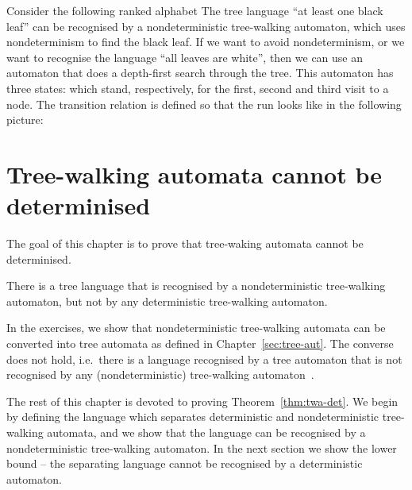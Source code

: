 \begin{example}\label{ex:dfs}
Consider the following ranked alphabet 
The tree language ``at least one black leaf'' can be recognised by a nondeterministic tree-walking automaton, which uses nondeterminism to find the black leaf. If we want to avoid nondeterminism, or we want to recognise the language ``all leaves are white'', then  we can use an automaton that does a depth-first search through the tree. This automaton has three states: 
which stand, respectively, for the first, second and third visit to a node. The   transition relation is defined so that the run looks like in the following picture:
\end{example}

\section{Tree-walking automata cannot be determinised}
The goal of this chapter is to prove that tree-waking automata cannot be determinised. 
\begin{theorem}\label{thm:twa-det}\cite[Theorem 5]{Bojanczyk:2006ff}
	There is a tree language that is recognised by a nondeterministic tree-walking automaton, but not by any deterministic tree-walking automaton.
\end{theorem}
In the exercises, we show that nondeterministic tree-walking automata can be converted into  tree automata as defined in Chapter~\ref{sec:tree-aut}. The converse does not hold, i.e.~there is a language recognised by a tree automaton that is not recognised by any (nondeterministic) tree-walking automaton~\cite[Theorem 2]{Bojanczyk:2008cx}. 

The rest of this chapter is devoted to proving Theorem~\ref{thm:twa-det}.
We begin by defining the language which separates deterministic and nondeterministic tree-walking automata, and we show that the language can be recognised by a nondeterministic tree-walking automaton. In the next section we show the lower bound --  the separating language cannot be recognised by a deterministic automaton.

